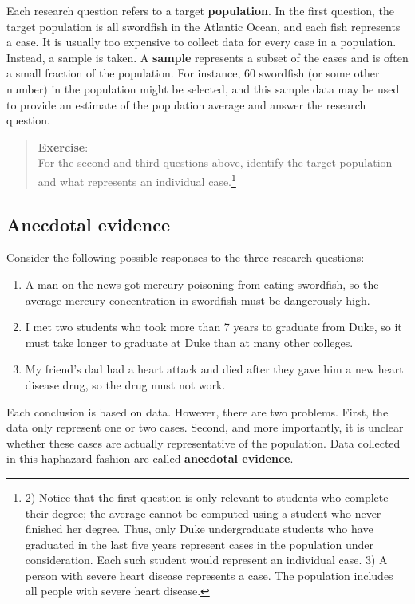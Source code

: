 \documentclass[
]{book}
\providecommand{\tightlist}{%
  \setlength{\itemsep}{0pt}\setlength{\parskip}{0pt}}
\begin{document}
Each research question refers to a target \textbf{population}. In the first question, the target population is all swordfish in the Atlantic Ocean, and each fish represents a case. It is usually too expensive to collect data for every case in a population. Instead, a sample is taken. A \textbf{sample} represents a subset of the cases and is often a small fraction of the population. For instance, 60 swordfish (or some other number) in the population might be selected, and this sample data may be used to provide an estimate of the population average and answer the research question.

\begin{quote}
\textbf{Exercise}:\\
For the second and third questions above, identify the target population and what represents an individual case.\footnote{ 2) Notice that the first question is only relevant to students who complete their degree; the average cannot be computed using a student who never finished her degree. Thus, only Duke undergraduate students who have graduated in the last five years represent cases in the population under consideration. Each such student would represent an individual case. 3) A person with severe heart disease represents a case. The population includes all people with severe heart disease.}
\end{quote}

\hypertarget{anecdotal-evidence}{%
\subsection{Anecdotal evidence}\label{anecdotal-evidence}}

Consider the following possible responses to the three research questions:

\begin{enumerate}
\def\labelenumi{\arabic{enumi}.}
\tightlist
\item
  A man on the news got mercury poisoning from eating swordfish, so the average mercury concentration in swordfish must be dangerously high.
\item
  I met two students who took more than 7 years to graduate from Duke, so it must take longer to graduate at Duke than at many other colleges.
\item
  My friend's dad had a heart attack and died after they gave him a new heart disease drug, so the drug must not work.
\end{enumerate}

Each conclusion is based on data. However, there are two problems. First, the data only represent one or two cases. Second, and more importantly, it is unclear whether these cases are actually representative of the population. Data collected in this haphazard fashion are called \textbf{anecdotal evidence}.
\end{document}
